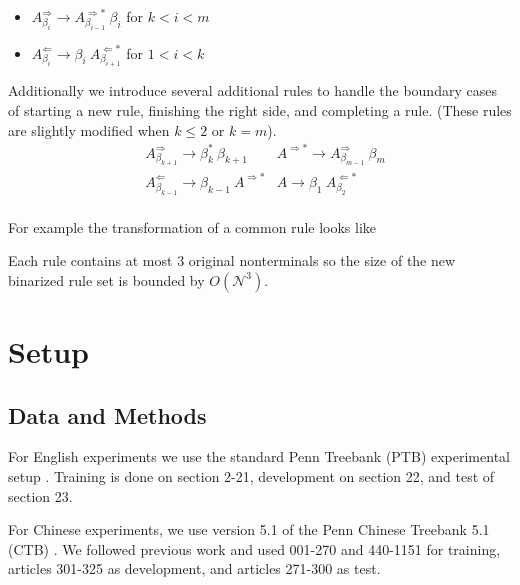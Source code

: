 \documentclass[11pt,letterpaper]{article}
\newcommand{\nonterms}{\mathcal{N}}
\newcommand{\Rule}[3]{#1 \rightarrow #2\ #3}
\newcommand{\RuleA}[3]{#1 \rightarrow #2^*\ #3}
\begin{document}
\begin{itemize}

\item
$\Rule{A^{\Rightarrow}_{\beta_i}}{A^{\Rightarrow*}_{\beta_{i-1}}}{\beta_i}$ for $k < i < m$

\item
$\Rule{A^{\Leftarrow}_{\beta_i}} {\beta_i}{A^{\Leftarrow*}_{\beta_{i+1}}} $ for $1< i < k$
\end{itemize}



Additionally we introduce several additional rules to handle the boundary cases of starting a new rule, finishing the right side, and completing a rule. (These rules are slightly modified when $k\leq 2$ or $k=m$).
\begin{align*}
& \RuleA{A^{\Rightarrow}_{\beta_{k+1}}}{\beta_k}{\beta_{k+1}} & \Rule{A^{\Rightarrow*}} {A^{\Rightarrow}_{\beta_{m-1}}}{\beta_m} \\
 &\Rule{A^{\Leftarrow}_{\beta_{k-1}}}{\beta_{k-1}}{A^{\Rightarrow *}} & \Rule{A}{\beta_1}{ A^{\Leftarrow*}_{\beta_{2}}}\\
\end{align*}

\noindent For example the transformation of a common rule looks like

\begin{center}
\end{center}

\noindent Each rule contains at most 3 original nonterminals so the size of the new binarized rule set is bounded by $O(\nonterms^3)$.

\section{Setup}


\subsection{Data and Methods}

For English experiments we use the standard Penn Treebank (PTB)
experimental setup \cite{marcus1993building}. Training is done on
section 2-21, development on section 22, and test of section 23.

For Chinese experiments, we use version 5.1 of the Penn  Chinese Treebank 5.1 (CTB) \cite{xue2005penn}. We followed previous work and used
001-270 and 440-1151 for training, articles
301-325 as development, and articles
271-300 as test.
\end{document}
